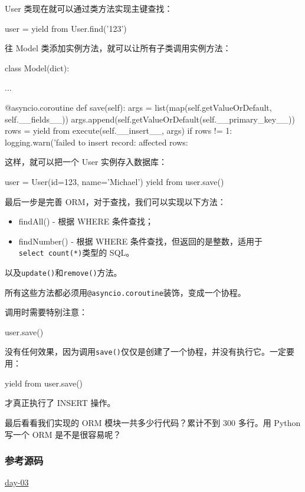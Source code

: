 User 类现在就可以通过类方法实现主键查找：

\begin{pythoncode}
user = yield from User.find('123')
\end{pythoncode}

往 Model 类添加实例方法，就可以让所有子类调用实例方法：

\begin{pythoncode}
class Model(dict):

    ...

    @asyncio.coroutine
    def save(self):
        args = list(map(self.getValueOrDefault, self.__fields__))
        args.append(self.getValueOrDefault(self.__primary_key__))
        rows = yield from execute(self.__insert__, args)
        if rows != 1:
            logging.warn('failed to insert record: affected rows: %
\end{pythoncode}

这样，就可以把一个 User 实例存入数据库：

\begin{pythoncode}
user = User(id=123, name='Michael')
yield from user.save()
\end{pythoncode}

最后一步是完善 ORM，对于查找，我们可以实现以下方法：

\begin{itemize}
\item
  findAll() - 根据 WHERE 条件查找；
\item
  findNumber() - 根据 WHERE
  条件查找，但返回的是整数，适用于\texttt{select\ count(*)}类型的 SQL。
\end{itemize}

以及\texttt{update()}和\texttt{remove()}方法。

所有这些方法都必须用\texttt{@asyncio.coroutine}装饰，变成一个协程。

调用时需要特别注意：

\begin{pythoncode}
user.save()
\end{pythoncode}

没有任何效果，因为调用\texttt{save()}仅仅是创建了一个协程，并没有执行它。一定要用：

\begin{pythoncode}
yield from user.save()
\end{pythoncode}

才真正执行了 INSERT 操作。

最后看看我们实现的 ORM 模块一共多少行代码？累计不到 300 多行。用 Python
写一个 ORM 是不是很容易呢？

\hypertarget{ux53c2ux8003ux6e90ux7801}{%
\subsubsection{参考源码}\label{ux53c2ux8003ux6e90ux7801}}

\href{https://github.com/michaelliao/awesome-python3-webapp/tree/day-03}{day-03}

